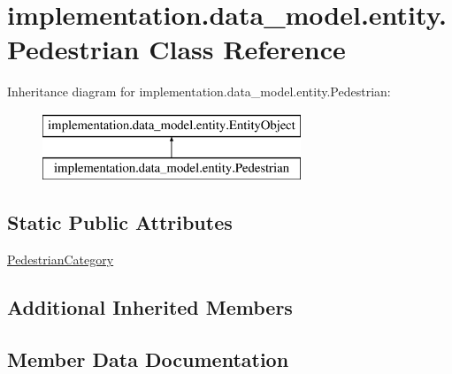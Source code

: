 \hypertarget{classimplementation_1_1data__model_1_1entity_1_1_pedestrian}{}\section{implementation.\+data\+\_\+model.\+entity.\+Pedestrian Class Reference}
\label{classimplementation_1_1data__model_1_1entity_1_1_pedestrian}
Inheritance diagram for implementation.\+data\+\_\+model.\+entity.\+Pedestrian\+:\begin{figure}[H]
\begin{center}
\leavevmode
\includegraphics[height=2.000000cm]{classimplementation_1_1data__model_1_1entity_1_1_pedestrian}
\end{center}
\end{figure}
\subsection*{Static Public Attributes}
\begin{DoxyCompactItemize}
\item 
\hyperlink{classimplementation_1_1data__model_1_1entity_1_1_pedestrian_a32f375a8c021a43d5784348a15e232e9}{Pedestrian\+Category}
\end{DoxyCompactItemize}
\subsection*{Additional Inherited Members}


\subsection{Member Data Documentation}
\mbox{\label{classimplementation_1_1data__model_1_1entity_1_1_pedestrian_a32f375a8c021a43d5784348a15e232e9}} 
